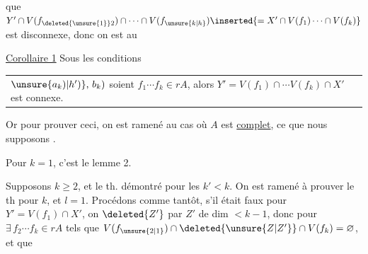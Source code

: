 que $Y'\cap V(f_{\deleted{\unsure{1}}2})\cap\cdots\cap V(f_{\unsure{k|h}})\inserted{=X'\cap V(f_1)\cdots\cap V(f_k)}$ est disconnexe,
donc on est  au

\uline{Corollaire 1} Sous les conditions

\noindent\begin{tabular}{@{}|p{.89\linewidth}@{}}
$\unsure{a_k)|h')} ,\, b_k)$ soient $f_1\cdots f_k\in rA$, alors
$Y'=V(f_1)\cap\cdots V(f_k)\cap X'$ est connexe.
\end{tabular}

Or pour prouver ceci, on
est ramené au cas où $A$ est
\uline{complet}, ce que nous supposons
.

Pour $k=1$, c'est le lemme 2.

Supposons $k\geq2$, et le th.
démontré pour les $k'<k$.  On est
ramené à prouver le th pour
$k$, et $l=1$. Procédons comme
tantôt, s'il était faux pour $Y'=V(f_1)\cap X'$,
on   $\deleted{Z'}$ par $Z'$ de
dim $<k-1$, donc pour $\exists\,f_2\cdots f_k\in rA$
tels que $V(f_{\unsure{2|1}})\cap\deleted{\unsure{Z|Z'}}\cap V(f_k)=\varnothing$, et que
